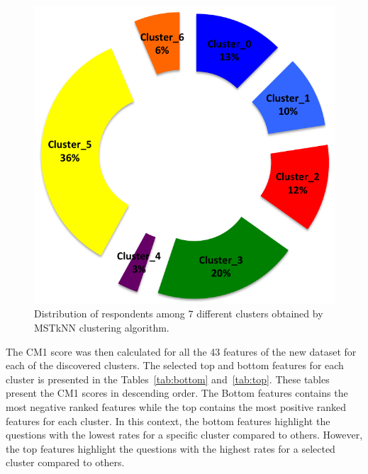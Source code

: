 \documentclass{article}
\begin{document}
\begin{figure}[h]
	\includegraphics[scale=0.5]{Clusters.png}
	\caption{Distribution of respondents among 7 different clusters obtained
	by MSTkNN clustering algorithm.}
	\label{fig:Clusters}
\end{figure}

The CM1 score was then calculated for all the 43 features of the new dataset
for each of the discovered clusters. The selected top and bottom features for
each cluster is presented in the Tables~\ref{tab:bottom} and~\ref{tab:top}.
These tables present the CM1 scores in descending order. The Bottom features
contains the most negative ranked features while the top contains the most
positive ranked features for each cluster. In this context, the bottom features
highlight the questions with the lowest rates for a specific cluster compared to
others. However, the top features highlight the questions with the highest rates
for a selected cluster compared to others.
\end{document}
